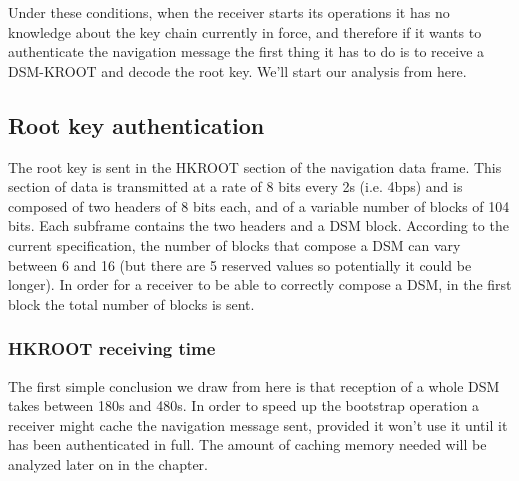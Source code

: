 Under these conditions, when the receiver starts its operations it has no
knowledge about the key chain currently in force, and therefore if it wants to
authenticate the navigation message the first thing it has to do is to receive a
DSM-KROOT and decode the root key. We'll start our analysis from here.

\subsection{Root key authentication}
The root key is sent in the HKROOT section of the navigation data frame. This
section of data is transmitted at a rate of 8 bits every 2s (i.e. 4bps) and is
composed of two headers of 8 bits each, and of a variable number of blocks of
104 bits. Each subframe contains the two headers and a DSM block. According to
the current specification, the number of blocks that compose a DSM can vary
between 6 and 16 (but there are 5 reserved values so potentially it could be
longer). In order for a receiver to be able to correctly compose a DSM, in the
first block the total number of blocks is sent.

\subsubsection{HKROOT receiving time}
The first simple conclusion we draw from here is that reception of a whole DSM
takes between 180s and 480s. In order to speed up the bootstrap operation a
receiver might cache the navigation message sent, provided it won't use it until
it has been authenticated in full. The amount of caching memory needed will be
analyzed later on in the chapter.

